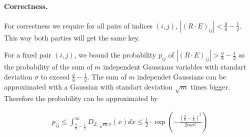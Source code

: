 \documentclass[12pt]{article}
\begin{document}
\paragraph{Correctness.}
For correctness we require for all pairs of indices $(i, j)$, $|(R\cdot E)_{ij}| < \frac{q}{8} - \frac{1}{2}$. This way both parties will get the same key.
\begin{comment}
(***) The probability of failure is therefore bounded by the probability that there exists $(i,j)$, $|E_{ij}| \geq \frac{\frac{q}{8} - \frac{1}{2}}{m}$.The latter equals to $2m \sum_{x = z}^\infty D_{\mathbb{Z}, \sigma}(x)$, we can upper bound it with the integral:
\begin{align*}
\sum_{x = z}^\infty D_{\mathbb{Z}, \sigma}(x) \leq \int_{z}^\infty D_{\mathbb{Z}, \sigma}(x) dx = \frac{1}{S} \int_{x}^\infty e^{-x^2 / 2\sigma^2}dx = \frac{\sigma \sqrt{2}}{S}\int_{z / \sqrt{2}\sigma}^\infty e^{-t^2}dt =\\
\frac{\sigma \sqrt{2}}{S}\cdot \frac{\sqrt{\pi}}{2}erfc\left(\frac{z}{2\sqrt{\sigma}}\right) \leq \frac{\sqrt{2\pi}\sigma}{2S}\cdot e^{-\left(\frac{z}{2 \sqrt{\sigma}}\right)^2}\\
\end{align*}
\begin{align*}
&S = 1 + 2 \sum_{k = 1}^\infty \exp(-k^2 / 2\sigma^2) \approx \sqrt{2 \pi} \sigma = 8,\;\;\; \sigma = 3.2
\end{align*}
We get that the probability of error is bounded by $m \cdot \frac{\sqrt{2\pi}\sigma}{S} \cdot \exp(-\frac{z^2}{4\sigma}) \approx m \cdot \exp(-(q - 4)^2 / (820 m^2))$. So for any set of parameters that we choose, we need to verify that this quantity is smaller than $2^{-128}$:
\begin{equation}
m \cdot \exp(-(q - 4)^2 / (820 m^2)) < 2^{-128}
\label{eq:correctness}
\end{equation}

(***)
An alternative bound: \end{comment}
For a fixed pair $(i, j)$, we bound the probability $p_{ij}$ of $|(R\cdot E)_{ij}| > \frac{q}{8} - \frac{1}{2}$ as the probability of the sum of $m$ independent Gaussians variables with standart deviation $\sigma$ to exceed $\frac{q}{8} - \frac{1}{2}$. The sum of $m$ independet Gaussians can be approximated with a Gaussian with standart deviation $\sqrt{m}$ times bigger. Therefore the probability can be approximated by
 
\begin{align*}
p_{ij} \leq \int_{\frac{q}{8} - \frac{1}{2}}^\infty D_{\mathbb{Z}, \sqrt{m}\sigma}(x) dx \leq \frac{1}{2}\cdot \exp\left(-\frac{\left(\frac{q}{8} - \frac{1}{2}\right)^2}{2m\sigma^2}\right)
\end{align*}
\end{document}
